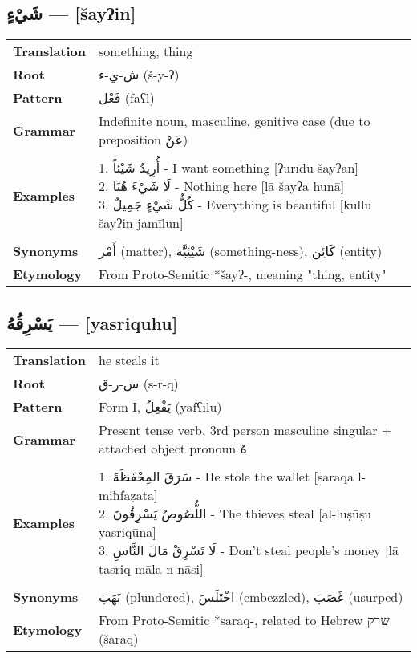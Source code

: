 \documentclass[letter,12pt]{article}
\begin{document}
\subsection{\textarabic{شَيْءٍ} — [šayʔin]}
\begin{tabular}{p{3cm}p{10cm}}
\toprule
\textbf{Translation} & something, thing \\
\textbf{Root} & \textarabic{ش-ي-ء} (š-y-ʔ) \\
\textbf{Pattern} & \textarabic{فَعْل} (faʕl) \\
\textbf{Grammar} & Indefinite noun, masculine, genitive case (due to preposition \textarabic{عَنْ}) \\
\midrule \\
\textbf{Examples} & \makecell[l]{\parbox{9.5cm}{
1. \textarabic{أُرِيدُ شَيْئاً} - I want something [ʔurīdu šayʔan]\\
2. \textarabic{لَا شَيْءَ هُنَا} - Nothing here [lā šayʔa hunā]\\
3. \textarabic{كُلُّ شَيْءٍ جَمِيلٌ} - Everything is beautiful [kullu šayʔin jamīlun]
}} \\
\midrule \\
\textbf{Synonyms} & \textarabic{أَمْر} (matter), \textarabic{شَيْئِيَّة} (something-ness), \textarabic{كَائِن} (entity) \\
\textbf{Etymology} & From Proto-Semitic *šayʔ-, meaning "thing, entity" \\
\bottomrule
\end{tabular}

\subsection{\textarabic{يَسْرِقُهُ} — [yasriquhu]}
\begin{tabular}{p{3cm}p{10cm}}
\toprule
\textbf{Translation} & he steals it \\
\textbf{Root} & \textarabic{س-ر-ق} (s-r-q) \\
\textbf{Pattern} & Form I, \textarabic{يَفْعِلُ} (yafʕilu) \\
\textbf{Grammar} & Present tense verb, 3rd person masculine singular + attached object pronoun \textarabic{هُ} \\
\midrule \\
\textbf{Examples} & \makecell[l]{\parbox{9.5cm}{
1. \textarabic{سَرَقَ المِحْفَظَةَ} - He stole the wallet [saraqa l-miħfaẓata]\\
2. \textarabic{اللُّصُوصُ يَسْرِقُونَ} - The thieves steal [al-luṣūṣu yasriqūna]\\
3. \textarabic{لَا تَسْرِقْ مَالَ النَّاسِ} - Don't steal people's money [lā tasriq māla n-nāsi]
}} \\
\midrule \\
\textbf{Synonyms} & \textarabic{نَهَبَ} (plundered), \textarabic{اخْتَلَسَ} (embezzled), \textarabic{غَصَبَ} (usurped) \\
\textbf{Etymology} & From Proto-Semitic *saraq-, related to Hebrew \texthebrew{שרק} (šāraq) \\
\bottomrule
\end{tabular}
\end{document}

